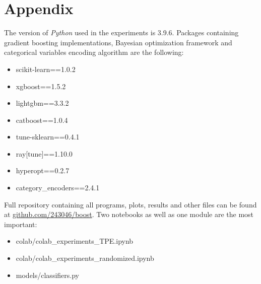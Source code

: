 \documentclass[magisterska, english]{pwr_wmat_praca_dyplomowa}
\theoremstyle{plain}
\numberwithin{theorem}{chapter}
\theoremstyle{definition}
\numberwithin{theorem}{chapter}
\begin{document}
\newpage
\nocite{*}

\begin{appendices}\label{appendix}
\chapter*{Appendix}
The version of \emph{Python} used in the experiments is 3.9.6.
Packages containing gradient boosting implementations, Bayesian optimization framework and categorical variables encoding algorithm are the following:

\begin{itemize}
\item scikit-learn==1.0.2
\item xgboost==1.5.2
\item lightgbm==3.3.2
\item catboost==1.0.4
\item tune-sklearn==0.4.1
\item ray[tune]==1.10.0
\item hyperopt==0.2.7
\item category\_encoders==2.4.1
\end{itemize}

Full repository containing all programs, plots, results and other files can be found at \url{github.com/243046/boost}. Two notebooks as well as one module are the most important:
\begin{itemize}
\item colab/colab\_experiments\_TPE.ipynb
\item colab/colab\_experiments\_randomized.ipynb
\item models/classifiers.py
\end{itemize}
\end{appendices}
\end{document}
